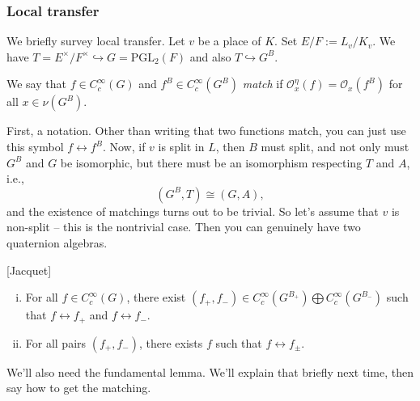 \documentclass[reqno]{amsart} 
\numberwithin{theorem}{section}
\numberwithin{equation}{section}
\numberwithin{exercise}{section}
\begin{document}
\subsubsection{Local transfer}

We briefly survey local transfer.  Let $v$ be a place of $K$.  Set $E / F := L_v / K_v$.  We have $T = E^\times / F^\times \hookrightarrow G = \mathrm{PGL}_2(F)$ and also $T \hookrightarrow G^B$.
\begin{definition}\label{definition:cq6tydlv0l}
  We say that $f \in C_c^\infty(G)$ and $f^B \in C_c^\infty(G^B)$ \emph{match} if $\mathcal{O}_x^\eta(f) = \mathcal{O}_x(f^B)$ for all $x \in \nu(G^B)$.
\end{definition}

First, a notation.  Other than writing that two functions match, you can just use this symbol $f \leftrightarrow f^B$.  Now, if $v$ is split in $L$, then $B$ must split, and not only must $G^B$ and $G$ be isomorphic, but there must be an isomorphism respecting $T$ and $A$, i.e.,
\begin{equation*}
  (G^B, T) \cong(G, A),
\end{equation*}
and the existence of matchings turns out to be trivial.  So let's assume that $v$ is non-split -- this is the nontrivial case.  Then you can genuinely have two quaternion algebras.
\begin{theorem}\label{theorem:cq6tydtozy}[Jacquet]
  \begin{enumerate}[(i)]
  \item For all $f \in C_c^\infty(G)$, there exist $(f_+, f_-) \in C_c^\infty(G^{B_+}) \bigoplus C_c^\infty(G^{B_-})$ such that $f \leftrightarrow f_+$ and $f \leftrightarrow f_-$.
  \item For all pairs $(f_+, f_-)$, there exists $f$ such that $f \leftrightarrow f_{\pm}$.
  \end{enumerate}
\end{theorem}
We'll also need the fundamental lemma.  We'll explain that briefly next time, then say how to get the matching.
\end{document}

